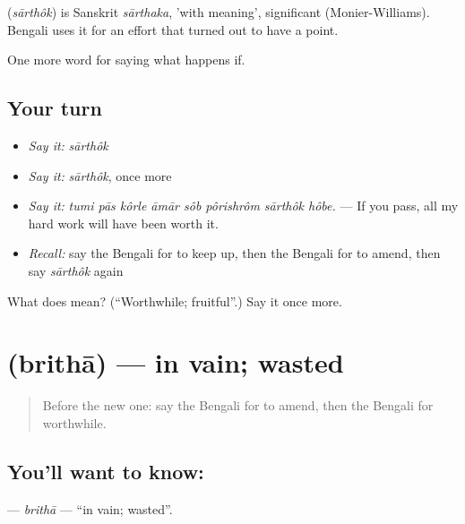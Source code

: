 \begin{cousinweb}
\textbf{} (\emph{sārthôk}) is Sanskrit \emph{sārthaka}, 'with meaning', significant (Monier-Williams). Bengali uses it for an effort that turned out to have a point.
\end{cousinweb}

\begin{grammarlens}[title={What you've built}]
One more word for saying what happens if.
\end{grammarlens}

\subsection*{Your turn}
\begin{itemize}
\raggedright
  \item \emph{Say it:} \emph{sārthôk}
  \item \emph{Say it:} \emph{sārthôk}, once more
  \item \emph{Say it:} \emph{tumi pās kôrle āmār sôb pôrishrôm sārthôk hôbe.} — If you pass, all my hard work will have been worth it.
  \item \emph{Recall:} say the Bengali for to keep up, then the Bengali for to amend, then say \emph{sārthôk} again
\end{itemize}

\begin{tcolorbox}[breakable,colback=teal!4,colframe=teal!35!black,title={Before you move on}]
What does  mean? (\textquotedblleft{}Worthwhile; fruitful\textquotedblright{}.) Say it once more.
\end{tcolorbox}
\section[\texorpdfstring{\bn{বৃথা} (brithā)}{বৃথা (brithā)}]{ (brithā) — in vain; wasted}

\label{lesson:BN-C383-britha}



\begin{quote}
Before the new one: say the Bengali for to amend, then the Bengali for worthwhile.
\end{quote}

\subsection*{You'll want to know: }
\textbf{} — \emph{brithā} — \textquotedblleft{}in vain; wasted\textquotedblright{}.

